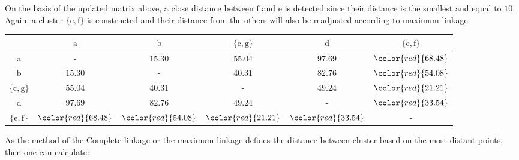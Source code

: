 	On the basis of the updated matrix above, a close distance between $\mathrm{f}$ and $\mathrm{e}$ is detected since their distance is the smallest and equal to $10$. Again, a cluster $\{\mathrm{e}, \mathrm{f}\}$ is constructed and their distance from the others will also be readjusted according to maximum linkage:
	\begin{table}[H]
		\centering
		\begin{tabular}{|c|c|c|c|c|c|}
		\hline
		 & $\mathrm{a}$ & $\mathrm{b}$ & $\{\mathrm{c},\mathrm{g}\}$ & $\mathrm{d}$ & $\{\mathrm{e},\mathrm{f}\}$ \\ \hline
		$\mathrm{a}$ & - & $15.30$ & $55.04$ & $97.69$ & $\color{red}{68.48}$ \\ \hline
		$\mathrm{b}$ & $15.30$ & - & $40.31$ & $82.76$ & $\color{red}{54.08}$ \\ \hline
		$\{\mathrm{c},\mathrm{g}\}$ & $55.04$ & $40.31$ & - & $49.24$ & $\color{red}{21.21}$ \\ \hline
		$\mathrm{d}$ & $97.69$ & $82.76$ & $49.24$ & - & $\color{red}{33.54}$ \\ \hline
		$\{\mathrm{e},\mathrm{f}\}$ & $\color{red}{68.48}$ & $\color{red}{54.08}$ & $\color{red}{21.21}$ & $\color{red}{33.54}$ & - \\ \hline
		\end{tabular}
	\end{table}
	As the method of the Complete linkage or the maximum linkage defines the distance between cluster based on the most distant points, then one can calculate:
	

